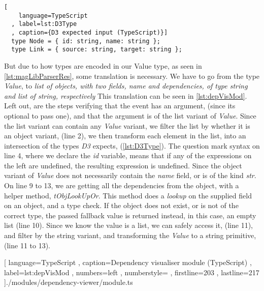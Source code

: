 \begin{lstlisting}[
    language=TypeScript
  , label=lst:D3Type
  , caption={D3 expected input (TypeScript)}]
  type Node = { id: string, name: string };
  type Link = { source: string, target: string };
\end{lstlisting}

But due to how types are encoded in our Value type, as seen in
\ref{lst:magLibParserRes}, some translation is necessary. We have to go from the
type \textit{Value}, to
\textit{
  list of objects, with two fields, name and dependencies, of type string and
  list of string, respectively}
This translation can be seen in \ref{lst:depVisMod}. Left out, are the steps
verifying that the event has an argument, (since its optional to pass one), and
that the argument is of the list variant of \textit{Value}. Since the list
variant can contain any \textit{Value} variant, we filter the list by whether it
is an object variant, (line 2), we then transform each element in the list, into
an intersection of the types \textit{D3} expects, (\ref{lst:D3Type}). The
question mark syntax on line 4, where we declare the \textit{id} variable, means
that if any of the expressions on the left are undefined, the resulting
expression is undefined. Since the object variant of \textit{Value} does not
necessarily contain the \textit{name} field, or is of the kind \textit{str}. On
line 9 to 13, we are getting all the dependencies from the object, with a helper
method, \textit{tObjLookUpOr}. This method does a \textit{lookup} on the
supplied field on an object, and a type check. If the object does not exist, or
is not of the correct type, the passed fallback value is returned instead, in
this case, an empty list (line 10). Since we know the value is a list, we can
safely access it, (line 11), and filter by the string variant, and transforming
the \textit{Value} to a string primitive, (line 11 to 13).

\begin{code}[H]
  
    [ language=TypeScript
    , caption={Dependency visualiser module (TypeScript)}
    , label=lst:depVisMod
    , numbers=left
    , numberstyle=\tiny\color{gray}
    , firstline=203
    , lastline=217
    ]{./modules/dependency-viewer/module.ts}
\end{code}
